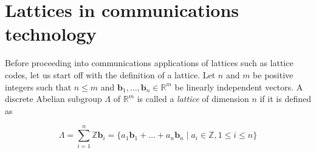 \documentclass[english,12pt,a4paper,pdftex,sci,utf8]{aaltothesis}
\begin{document}
\clearpage

\section{Lattices in communications technology}
\label{sec:lattices}
Before proceeding into communications applications of lattices such as lattice codes, let us start off with the definition of a lattice. Let $n$ and $m$ be positive integers such that $n \leq m$ and $\mathbf{b}_1, ... , \mathbf{b}_n \in \mathbb{R}^m$ be linearly independent vectors. A discrete Abelian subgroup $\Lambda$ of $\mathbb{R}^m$ is called a \emph{lattice} of dimension $n$ if it is defined as

\begin{equation}
\Lambda = \sum_{i=1}^{n} \mathbb{Z}\mathbf{b}_i = \{a_1\mathbf{b}_1 + \ldots + a_n\mathbf{b}_n \mid a_i \in \mathbb{Z}, 1 \leq i \leq n\}\label{eq:lattice}
\end{equation}
\end{document}
